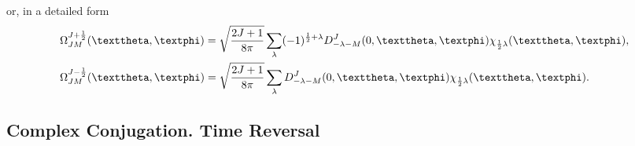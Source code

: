 \begin{enumerate}[label=(\alph*)]
\begin{equation}
\end{equation}
or, in a detailed form
\begin{align}
& \Omega_{J M}^{J+\frac{1}{2}}(\vartheta, \varphi)=\sqrt{\frac{2 J+1}{8 \pi}} \sum_{\lambda}(-1)^{\frac{1}{2}+\lambda} D_{-\lambda-M}^{J}(0, \vartheta, \varphi) \chi_{\frac{1}{2} \lambda}(\vartheta, \varphi), \label{eq:7:2:15}\\
& \Omega_{J M}^{J-\frac{1}{2}}(\vartheta, \varphi)=\sqrt{\frac{2 J+1}{8 \pi}} \sum_{\lambda} D_{-\lambda-M}^{J}(0, \vartheta, \varphi) \chi_{\frac{1}{2} \lambda}(\vartheta, \varphi). \notag
\end{align}
\end{enumerate}

\subsection{Complex Conjugation. Time Reversal}\label{sec:7.2.3}
